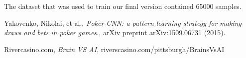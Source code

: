 \documentclass[]{report}
\begin{document}
The dataset that was used to train our final version contained 65000 samples. 

\begin{thebibliography}{}
	 Yakovenko, Nikolai, et al., \emph{Poker-CNN: a pattern learning strategy for making draws and bets in poker games.}, arXiv preprint arXiv:1509.06731 (2015).
	
	 Rivercasino.com, \emph{Brain VS AI},
	riverscasino.com/pittsburgh/BrainsVsAI

\end{thebibliography}  
\end{document}
